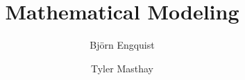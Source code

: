 \documentclass[graybox,envcountchap,sectrefs]{svmono}
\begin{document}
\author{Bj\"{o}rn Engquist \and Tyler Masthay}
\title{Mathematical Modeling}
\maketitle

\frontmatter%

%
%

%

\tableofcontents




\mainmatter%


%

\backmatter%
%
%
\printindex


\end{document}

